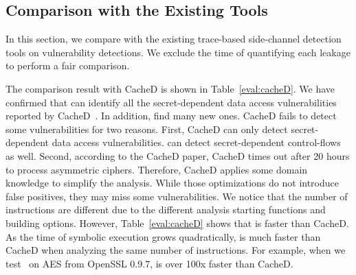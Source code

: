 \subsection{Comparison with the Existing Tools}
\label{eval:scala}

In this section, we compare \tool{} with the
existing trace-based side-channel detection tools on vulnerability detections.
We exclude the time of quantifying each leakage to perform a fair comparison.

The comparison result with CacheD is shown in Table~\ref{eval:cacheD}.
We have confirmed that \tool{} can identify all the secret-dependent data access vulnerabilities reported by CacheD~\cite{203878}. In addition, \tool{} find many new ones. 
CacheD fails to detect some vulnerabilities for two
reasons. First, CacheD can only detect secret-dependent data access
vulnerabilities. \tool{} can detect secret-dependent control-flows as well.
Second, according to the CacheD paper, CacheD times out after 20 hours to process
asymmetric ciphers. Therefore, CacheD applies some domain knowledge to simplify 
the analysis. 
While those optimizations do not introduce false positives, they may miss some
vulnerabilities. 
We notice that the number of instructions are different due to the different analysis starting 
functions and building options. 
However, Table~\ref{eval:cacheD} shows that
\tool{} is faster than CacheD. As the time of symbolic execution
grows quadratically, \tool{} is much faster than CacheD when analyzing the same
number of instructions. For example, when we test~\tool{} on AES from OpenSSL
0.9.7, \tool{} is over 100x faster than CacheD.

